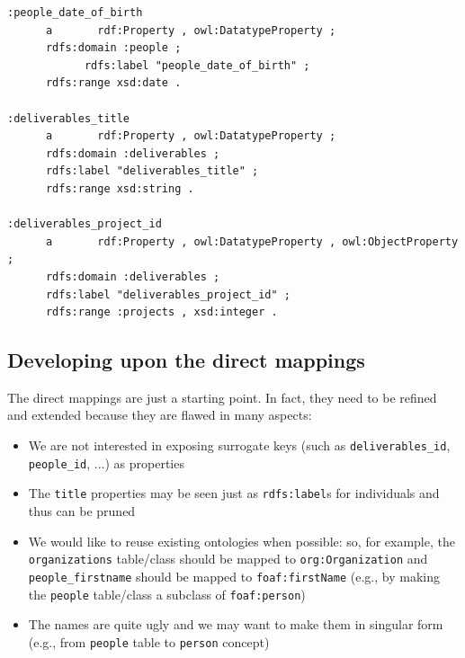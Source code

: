 \documentclass[11pt]{llncs}
\begin{document}
\begin{lstlisting}
:people_date_of_birth
      a       rdf:Property , owl:DatatypeProperty ;
      rdfs:domain :people ;
            rdfs:label "people_date_of_birth" ;
      rdfs:range xsd:date .

:deliverables_title
      a       rdf:Property , owl:DatatypeProperty ;
      rdfs:domain :deliverables ;
      rdfs:label "deliverables_title" ;
      rdfs:range xsd:string .

:deliverables_project_id
      a       rdf:Property , owl:DatatypeProperty , owl:ObjectProperty ;
      rdfs:domain :deliverables ;
      rdfs:label "deliverables_project_id" ;
      rdfs:range :projects , xsd:integer . 
\end{lstlisting}


\subsection{Developing upon the direct mappings}

The direct mappings are just a starting point. In fact, they need to be refined and extended because they are flawed in many aspects:

\begin{itemize}
 \item We are not interested in exposing surrogate keys (such as \texttt{deliverables\_id}, \texttt{people\_id}, ...) as properties

 \item The \texttt{title} properties may be seen just as \texttt{rdfs:label}s for individuals and thus can be pruned
 
 \item We would like to reuse existing ontologies when possible: so, for example, 
 the \texttt{organizations} table/class should be mapped 
 to \texttt{org:Organization} and \texttt{people\_firstname} should be mapped to \texttt{foaf:firstName}
 (e.g., by making the \texttt{people} table/class a subclass of \texttt{foaf:person})
 
 \item The names are quite ugly and we may want to make them in singular form 
  (e.g., from \texttt{people} table to \texttt{person} concept)
\end{itemize}
\end{document}
